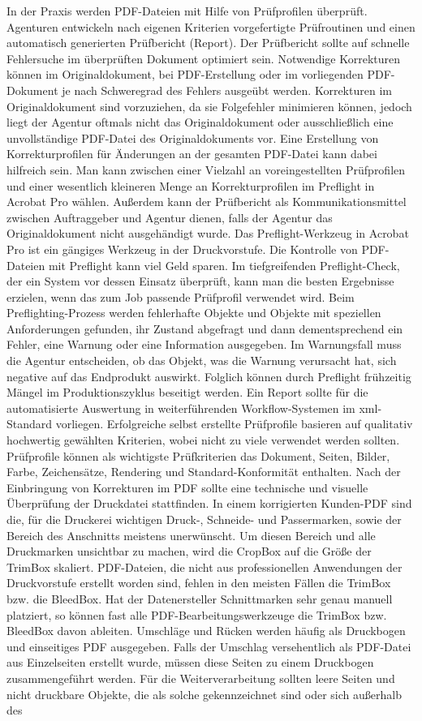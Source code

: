 In der Praxis werden PDF-Dateien mit Hilfe von Prüfprofilen überprüft. Agenturen entwickeln nach eigenen Kriterien vorgefertigte Prüfroutinen und einen automatisch generierten Prüfbericht (Report). Der Prüfbericht sollte auf schnelle Fehlersuche im überprüften Dokument optimiert sein. Notwendige Korrekturen können im Originaldokument, bei PDF-Erstellung oder im vorliegenden PDF-Dokument je nach Schweregrad des Fehlers ausgeübt werden. Korrekturen im Originaldokument sind vorzuziehen, da sie Folgefehler minimieren können, jedoch liegt der Agentur oftmals nicht das Originaldokument oder ausschließlich eine unvollständige PDF-Datei des Originaldokuments vor. Eine Erstellung von Korrekturprofilen für Änderungen an der gesamten PDF-Datei kann dabei hilfreich sein. Man kann zwischen einer Vielzahl an voreingestellten Prüfprofilen und einer wesentlich kleineren Menge an Korrekturprofilen im Preflight in Acrobat Pro wählen. Außerdem kann der Prüfbericht als Kommunikationsmittel zwischen Auftraggeber und Agentur dienen, falls der Agentur das Originaldokument nicht ausgehändigt wurde. Das Preflight-Werkzeug in Acrobat Pro ist ein gängiges Werkzeug in der Druckvorstufe. Die Kontrolle von PDF-Dateien mit Preflight kann viel Geld sparen. Im tiefgreifenden Preflight-Check, der ein System vor dessen Einsatz überprüft, kann man die besten Ergebnisse erzielen, wenn das zum Job passende Prüfprofil verwendet wird. Beim Preflighting-Prozess werden fehlerhafte Objekte und Objekte mit speziellen Anforderungen gefunden, ihr Zustand abgefragt und dann dementsprechend ein Fehler, eine Warnung oder eine Information ausgegeben. Im Warnungsfall muss die Agentur entscheiden, ob das Objekt, was die Warnung verursacht hat, sich negative auf das Endprodukt auswirkt. Folglich können durch Preflight frühzeitig Mängel im Produktionszyklus beseitigt werden. Ein Report sollte für die automatisierte Auswertung in weiterführenden Workflow-Systemen im \gls{xml}-Standard vorliegen. Erfolgreiche selbst erstellte Prüfprofile basieren auf qualitativ hochwertig gewählten Kriterien, wobei nicht zu viele verwendet werden sollten. Prüfprofile können als wichtigste Prüfkriterien das Dokument, Seiten, Bilder, Farbe, Zeichensätze, Rendering und Standard-Konformität enthalten. Nach der Einbringung von Korrekturen im PDF sollte eine technische und visuelle Überprüfung der Druckdatei stattfinden. In einem korrigierten Kunden-PDF sind die, für die Druckerei wichtigen Druck-, Schneide- und Passermarken, sowie der Bereich des Anschnitts meistens unerwünscht. Um diesen Bereich und alle Druckmarken unsichtbar zu machen, wird die CropBox auf die Größe der TrimBox skaliert. PDF-Dateien, die nicht aus professionellen Anwendungen der Druckvorstufe erstellt worden sind, fehlen in den meisten Fällen die TrimBox bzw. die BleedBox. Hat der Datenersteller Schnittmarken sehr genau manuell platziert, so können fast alle PDF-Bearbeitungswerkzeuge die TrimBox bzw. BleedBox davon ableiten. Umschläge und Rücken werden häufig als Druckbogen und einseitiges PDF ausgegeben. Falls der Umschlag versehentlich als PDF-Datei aus Einzelseiten erstellt wurde, müssen diese Seiten zu einem Druckbogen zusammengeführt werden. Für die Weiterverarbeitung sollten leere Seiten und nicht druckbare Objekte, die als solche gekennzeichnet sind oder sich außerhalb des 